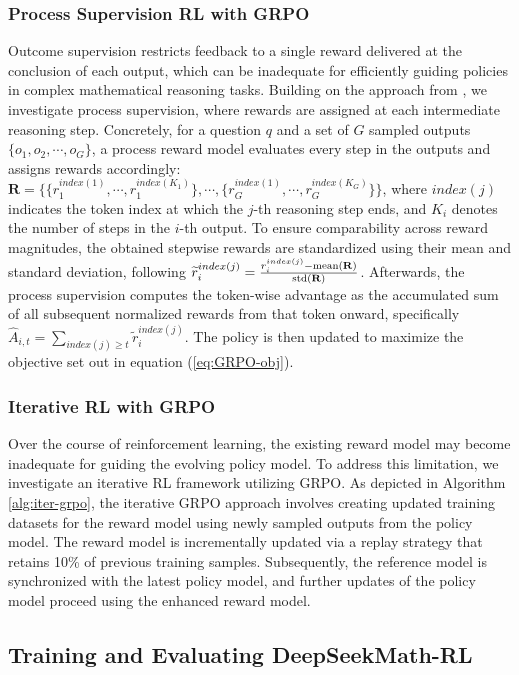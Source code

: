 \begin{itemize}[topsep=0pt]
\begin{itemize}[topsep=0pt]
\subsubsection{Process Supervision RL with GRPO} Outcome supervision restricts feedback to a single reward delivered at the conclusion of each output, which can be inadequate for efficiently guiding policies in complex mathematical reasoning tasks. Building on the approach from \cite{wang2023math}, we investigate process supervision, where rewards are assigned at each intermediate reasoning step. Concretely, for a question $q$ and a set of $G$ sampled outputs $\{o_1, o_2, \cdots, o_G\}$, a process reward model evaluates every step in the outputs and assigns rewards accordingly: $\mathbf{R} = \{ \{r_1^{index(1)},\cdots,r_1^{index(K_1)}\}, \cdots,  \{r_G^{index(1)},\cdots,r_G^{index(K_G)}\} \}$, where $index(j)$ indicates the token index at which the $j$-th reasoning step ends, and $K_i$ denotes the number of steps in the $i$-th output. To ensure comparability across reward magnitudes, the obtained stepwise rewards are standardized using their mean and standard deviation, following $\widetilde{r}_i^{index(j)} = \frac{r_i^{index(j)} - {\rm mean(\mathbf{R})}}{{\rm std(\mathbf{R})}}$. Afterwards, the process supervision computes the token-wise advantage as the accumulated sum of all subsequent normalized rewards from that token onward, specifically $\hat{A}_{i, t} = \sum_{index(j) \ge t} \widetilde{r}_i^{index(j)}$. The policy is then updated to maximize the objective set out in equation (\ref{eq:GRPO-obj}).

\subsubsection{Iterative RL with GRPO} Over the course of reinforcement learning, the existing reward model may become inadequate for guiding the evolving policy model. To address this limitation, we investigate an iterative RL framework utilizing GRPO. As depicted in Algorithm \ref{alg:iter-grpo}, the iterative GRPO approach involves creating updated training datasets for the reward model using newly sampled outputs from the policy model. The reward model is incrementally updated via a replay strategy that retains 10\% of previous training samples. Subsequently, the reference model is synchronized with the latest policy model, and further updates of the policy model proceed using the enhanced reward model.

\subsection{Training and Evaluating DeepSeekMath-RL}


\end{itemize}
\end{itemize}
